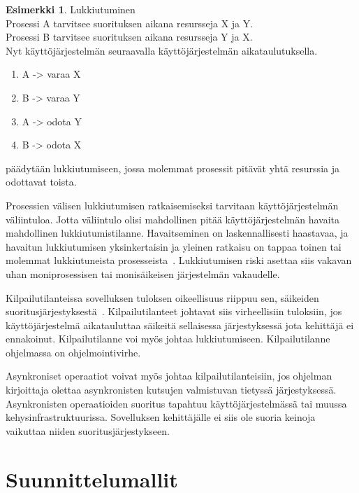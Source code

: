 \documentclass[finnish]{tktltiki2}
\theoremstyle{definition}
\newtheorem{esim}[lau]{Esimerkki}
\theoremstyle{remark}
\begin{document}
\begin{center}
  \begin{esim}
    Lukkiutuminen \\
    Prosessi A tarvitsee suorituksen aikana resursseja X ja Y. \\
    Prosessi B tarvitsee suorituksen aikana resursseja Y ja X. \\
    Nyt käyttöjärjestelmän seuraavalla käyttöjärjestelmän aikataulutuksella.
    \begin{enumerate}
      \item A -> varaa X
      \item B -> varaa Y
      \item A -> odota Y
      \item B -> odota X
    \end{enumerate}
    päädytään lukkiutumiseen, jossa molemmat prosessit
    pitävät yhtä resurssia ja odottavat toista.
  \end{esim}
\end{center}

Prosessien välisen lukkiutumisen ratkaisemiseksi tarvitaan
käyttöjärjestelmän väliintuloa. Jotta väliintulo olisi mahdollinen pitää
käyttöjärjestelmän havaita mahdollinen lukkiutumistilanne.
Havaitseminen on laskennallisesti haastavaa, ja havaitun lukkiutumisen
yksinkertaisin ja yleinen ratkaisu on tappaa toinen
tai molemmat lukkiutuneista prosesseista~\cite{stallings_operating_2018}.
Lukkiutumisen riski asettaa siis vakavan uhan moniprosessisen tai monisäikeisen
järjestelmän vakaudelle.

Kilpailutilanteissa sovelluksen tuloksen oikeellisuus riippuu sen,
säikeiden suoritusjärjestyksestä~\cite{stallings_operating_2018}.
Kilpailutilanteet johtavat siis
virheellisiin tuloksiin, jos käyttöjärjestelmä aikatauluttaa
säikeitä sellaisessa järjestyksessä jota kehittäjä ei ennakoinut.
Kilpailutilanne voi myös johtaa lukkiutumiseen.
Kilpailutilanne ohjelmassa on ohjelmointivirhe.

Asynkroniset operaatiot voivat myös johtaa kilpailutilanteisiin,
jos ohjelman kirjoittaja olettaa asynkronisten kutsujen
valmistuvan tietyssä järjestyksessä. Asynkronisten operaatioiden
suoritus tapahtuu käyttöjärjestelmässä tai muussa kehysinfrastruktuurissa.
Sovelluksen kehittäjälle ei siis ole suoria keinoja vaikuttaa
niiden suoritusjärjestykseen.

\section{Suunnittelumallit}\label{sec:SM}
\end{document}
